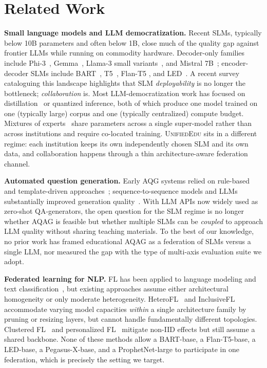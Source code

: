 \documentclass[11pt]{article}
\theoremstyle{plain}
\theoremstyle{definition}
\theoremstyle{remark}
\newcommand{\UniEdu}{\textsc{UnifiedEdu}}
\begin{document}
\section{Related Work}
\label{sec:related}

\textbf{Small language models and LLM democratization.}
Recent SLMs, typically below 10B parameters and
often below 1B, close much of the quality gap
against frontier LLMs while running on commodity
hardware. Decoder-only families include
Phi-3~\citep{abdin2024phi3},
Gemma~\citep{team2024gemma},
Llama-3 small variants~\citep{grattafiori2024llama3},
and Mistral 7B~\citep{jiang2023mistral}; encoder-decoder
SLMs include BART~\citep{lewis2020bart},
T5~\citep{raffel2020exploring}, Flan-T5
\citep{chung2024scaling}, and
LED~\citep{beltagy2020longformer}. A recent
survey~\citep{qin2025slm_survey} cataloguing this
landscape highlights that SLM \emph{deployability} is
no longer the bottleneck; \emph{collaboration} is.
Most LLM-democratization work has focused on
distillation~\citep{hinton2015distilling} or quantized
inference, both of which produce one model trained on
one (typically large) corpus and one (typically
centralized) compute budget. Mixtures of
experts~\citep{jacobs1991adaptive,
shazeer2017outrageously} share parameters across a
single super-model rather than across institutions and
require co-located training. \UniEdu{} sits in a
different regime: each institution keeps its own
independently chosen SLM and its own data, and
collaboration happens through a thin
architecture-aware federation channel.

\textbf{Automated question generation.}
Early AQG systems relied on rule-based and
template-driven approaches~\citep{kurdi2020systematic};
sequence-to-sequence models and LLMs substantially
improved generation quality~\citep{pan2019recent}.
With LLM APIs now widely used as zero-shot
QA-generators, the open question for the SLM regime is
no longer whether AQAG is feasible but whether
multiple SLMs can be \emph{coupled} to approach
LLM quality without sharing teaching materials. To
the best of our knowledge, no prior work has framed
educational AQAG as a federation of SLMs versus a
single LLM, nor measured the gap with the type of
multi-axis evaluation suite we adopt.

\textbf{Federated learning for NLP.}
FL has been applied to language modeling and text
classification~\citep{mcmahan2017communication,
li2020federated, kairouz2021advances}, but existing
approaches assume either architectural homogeneity or
only moderate heterogeneity.
HeteroFL~\citep{diao2021heterofl} and
InclusiveFL~\citep{liu2022no} accommodate varying
model capacities \emph{within} a single architecture
family by pruning or resizing layers, but cannot
handle fundamentally different topologies. Clustered
FL~\citep{sattler2020clustered} and personalized
FL~\citep{li2021fedbn} mitigate non-IID effects but
still assume a shared backbone. None of these methods
allow a BART-base, a Flan-T5-base, a LED-base, a
Pegasus-X-base, and a ProphetNet-large to participate
in one federation, which is precisely the setting we
target.
\end{document}

